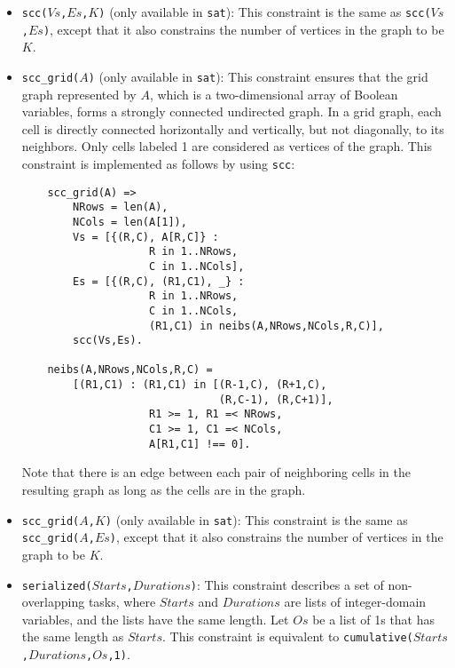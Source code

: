 \begin{itemize}
\item \texttt{scc($Vs$,$Es$,$K$)} (only available in \texttt{sat}):  This constraint is the same as \texttt{scc($Vs$,$Es$)}, except that it also constrains the number of vertices in the graph to be $K$. 

\item \texttt{scc\_grid($A$)} (only available in \texttt{sat}):  This constraint ensures that the grid graph represented by $A$, which is a two-dimensional array of Boolean variables, forms a strongly connected undirected graph. In a grid graph, each cell is directly connected horizontally and vertically, but not diagonally, to its neighbors. Only cells labeled 1 are considered as vertices of the graph. This constraint is implemented as follows by using \texttt{scc}:
\begin{verbatim}
    scc_grid(A) =>
        NRows = len(A),
        NCols = len(A[1]),
        Vs = [{(R,C), A[R,C]} : 
                    R in 1..NRows, 
                    C in 1..NCols],
        Es = [{(R,C), (R1,C1), _} : 
                    R in 1..NRows, 
                    C in 1..NCols,
                    (R1,C1) in neibs(A,NRows,NCols,R,C)],
        scc(Vs,Es).

    neibs(A,NRows,NCols,R,C) = 
        [(R1,C1) : (R1,C1) in [(R-1,C), (R+1,C), 
                               (R,C-1), (R,C+1)],
                    R1 >= 1, R1 =< NRows,
                    C1 >= 1, C1 =< NCols, 
                    A[R1,C1] !== 0].
\end{verbatim}
Note that there is an edge between each pair of neighboring cells in the resulting graph as long as the cells are in the graph.

\item \texttt{scc\_grid($A$,$K$)} (only available in \texttt{sat}): This constraint is the same as \texttt{scc\_grid($A$,$Es$)}, except that it also constrains the number of vertices in the graph to be $K$. 

\item \texttt{serialized($Starts$,$Durations$)}: This constraint describes a set of non-overlapping tasks, where $Starts$ and $Durations$ are lists of integer-domain variables, and the lists have the same length. Let $Os$ be a list of 1s that has the same length as $Starts$. This constraint is equivalent to \texttt{cumulative($Starts$,$Durations$,$Os$,1)}.


\end{itemize}
